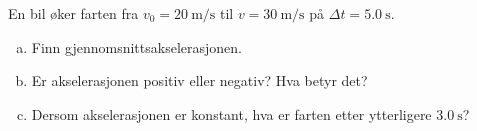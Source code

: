 %
En bil øker farten fra $v_0 = \SI{20}{\metre\per\second}$ til $v = \SI{30}{\metre\per\second}$ på $\Delta t = \SI{5.0}{\second}$.
\begin{enumerate}[a)]
    \item Finn gjennomsnittsakselerasjonen.
    \item Er akselerasjonen positiv eller negativ? Hva betyr det?
    \item Dersom akselerasjonen er konstant, hva er farten etter ytterligere $\SI{3.0}{\second}$?
\end{enumerate}

